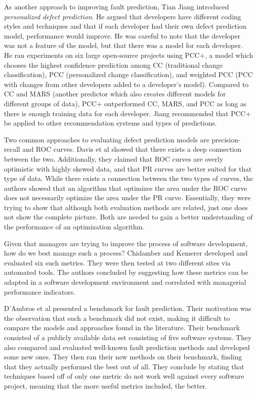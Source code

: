 \documentclass{sig-alternate-05-2015}
\begin{document}
As another approach to improving fault prediction, Tian Jiang \cite{Jiang} introduced \emph{personalized defect prediction}. He argued that developers have different coding styles and techniques and that if each developer had their own defect prediction model, performance would improve. He was careful to note that the developer was not a feature of the model, but that there was a model for each developer. He ran experiments on six large open-source projects using PCC+, a model which chooses the highest confidence prediction among CC (traditional change classification), PCC (personalized change classification), and weighted PCC (PCC with changes from other developers added to a developer's model). Compared to CC and MARS (another predictor which also creates different models for different groups of data), PCC+ outperformed CC, MARS, and PCC as long as there is enough training data for each developer. Jiang recommended that PCC+ be applied to other recommendation systems and types of predictions.

Two common approaches to evaluating defect prediction models are precision-recall and ROC curves. Davis et al \cite{Davis} showed that there exists a deep connection between the two. Additionally, they claimed that ROC curves are overly optimistic with highly skewed data, and that PR curves are better suited for that type of data. While there exists a connection between the two types of curves, the authors showed that an algorithm that optimizes the area under the ROC curve does not necessarily optimize the area under the PR curve. Essentially, they were trying to show that although both evaluation methods are related, just one does not show the complete picture. Both are needed to gain a better understanding of the performance of an optimization algorithm.

Given that managers are trying to improve the process of software development, how do we best manage such a process? Chidamber and Kemerer \cite{Chidamber}
developed and evaluated six such metrics. They were then tested at two different sites via automated tools. The authors concluded by suggesting how these metrics can be adapted in a software development environment and correlated with managerial performance indicators.

D'Ambros et al \cite{DAmbros} presented a benchmark for fault prediction. Their motivation was the observation that such a benchmark did not exist, making it difficult to compare the models and approaches found in the literature. Their benchmark consisted of a publicly available data set consisting of five software systems. They also compared and evaluated well-known fault prediction methods and developed some new ones. They then ran their new methods on their benchmark, finding that they actually performed the best out of all. They conclude by stating that techniques based off of only one metric do not work well against every software project, meaning that the more useful metrics included, the better.
\end{document}
